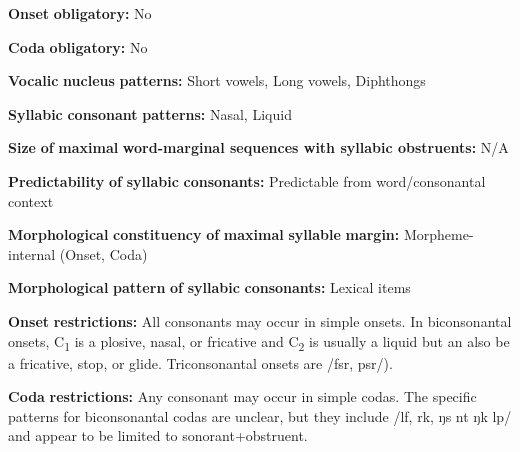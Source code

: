 \begin{styleBody}
\textbf{Onset} \textbf{obligatory:} No
\end{styleBody}

\begin{styleBody}
\textbf{Coda} \textbf{obligatory:} No
\end{styleBody}

\begin{styleBody}
\textbf{Vocalic} \textbf{nucleus} \textbf{patterns:} Short vowels, Long vowels, Diphthongs
\end{styleBody}

\begin{styleBody}
\textbf{Syllabic} \textbf{consonant} \textbf{patterns:} Nasal, Liquid
\end{styleBody}

\begin{styleBody}
\textbf{Size} \textbf{of} \textbf{maximal} \textbf{word{}-marginal sequences with syllabic obstruents:} N/A
\end{styleBody}

\begin{styleBody}
\textbf{Predictability} \textbf{of} \textbf{syllabic} \textbf{consonants:} Predictable from word/consonantal context
\end{styleBody}

\begin{styleBody}
\textbf{Morphological} \textbf{constituency} \textbf{of} \textbf{maximal} \textbf{syllable} \textbf{margin:} Morpheme-internal (Onset, Coda)
\end{styleBody}

\begin{styleBody}
\textbf{Morphological} \textbf{pattern} \textbf{of} \textbf{syllabic} \textbf{consonants:} Lexical items
\end{styleBody}

\begin{styleBody}
\textbf{Onset} \textbf{restrictions:} All consonants may occur in simple onsets. In biconsonantal onsets, C\textsubscript{1} is a plosive, nasal, or fricative and C\textsubscript{2} is usually a liquid but an also be a fricative, stop, or glide. Triconsonantal onsets are /fsr, psr/).
\end{styleBody}

\begin{styleBody}
\textbf{Coda} \textbf{restrictions:} Any consonant may occur in simple codas. The specific patterns for biconsonantal codas are unclear, but they include /lf, rk, ŋs nt ŋk lp/ and appear to be limited to sonorant+obstruent.
\end{styleBody}

